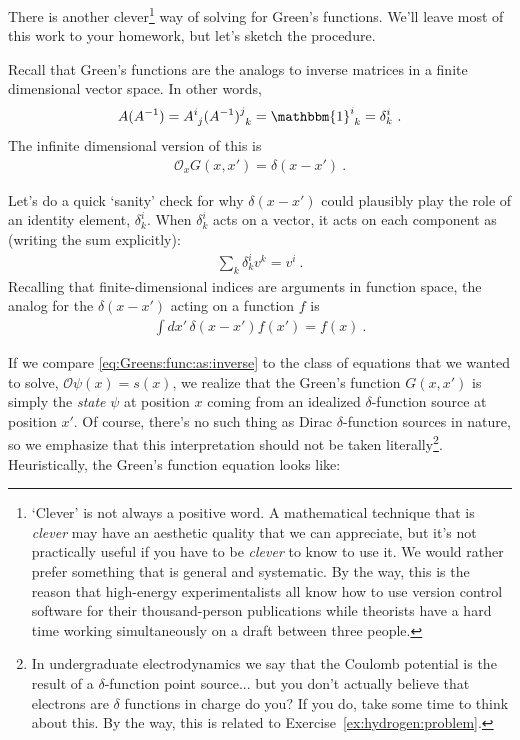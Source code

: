 There is another clever\footnote{`Clever' is not always a positive word. A mathematical technique that is \emph{clever} may have an aesthetic quality that we can appreciate, but it's not practically useful if you have to be \emph{clever} to know to use it. We would rather prefer something that is general and systematic. By the way, this is the reason that high-energy experimentalists all know how to use version control software for their thousand-person publications while theorists have a hard time working simultaneously on a draft between three people.} way of solving for Green's functions. We'll leave most of this work to your homework, but let's sketch the procedure. 

Recall that Green's functions are the analogs to inverse matrices in a finite dimensional vector space. In other words, 
\begin{align}
	A(A^{-1}) = \mat{A}{i}{j}\mat{(A^{-1})}{j}{k} = \mat{\mathbbm{1}}{i}{k} = \delta^i_k \ .
\end{align}
The infinite dimensional version of this is
\begin{align}
	\mathcal O_x G(x,x') = \delta(x-x') \ .
	\label{eq:Greens:func:as:inverse}
\end{align}
\begin{example}
Let's do a quick `sanity' check for why $\delta(x-x')$ could plausibly play the role of an identity element, $\delta^i_k$. When $\delta^i_k$ acts on a vector, it acts on each component as (writing the sum explicitly):
\begin{align}
	\sum_k \delta^i_k v^k = v^i \ .
\end{align}
Recalling that finite-dimensional indices are arguments in function space, the analog for the $\delta(x-x')$ acting on a function $f$ is
\begin{align}
	\int dx' \, \delta(x-x') f(x') = f(x) \ .
\end{align}
\end{example}
If we compare \eqref{eq:Greens:func:as:inverse} to the class of equations that we wanted to solve, $\mathcal O \psi(x) = s(x)$, we realize that the Green's function $G(x,x')$ is simply the \emph{state} $\psi$  at position $x$ coming from an idealized $\delta$-function source at position $x'$. Of course, there's no such thing as Dirac $\delta$-function sources in nature, so we emphasize that this interpretation should not be taken literally\footnote{In undergraduate electrodynamics we say that the Coulomb potential is the result of a $\delta$-function point source... but you don't actually believe that electrons are $\delta$ functions in charge do you? If you do, take some time to think about this. By the way, this is related to Exercise~\ref{ex:hydrogen:problem}.}.  Heuristically, the Green's function equation looks like:

